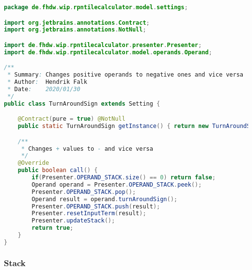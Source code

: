 \begin{lstlisting}[caption=TurnAroundSign (Falk),label=list:TurnAroundSign,language=Java]
package de.fhdw.wip.rpntilecalculator.model.settings;

import org.jetbrains.annotations.Contract;
import org.jetbrains.annotations.NotNull;

import de.fhdw.wip.rpntilecalculator.presenter.Presenter;
import de.fhdw.wip.rpntilecalculator.model.operands.Operand;

/**
 * Summary: Changes positive operands to negative ones and vice versa
 * Author:  Hendrik Falk
 * Date:    2020/01/30
 */
public class TurnAroundSign extends Setting {

    @Contract(pure = true) @NotNull
    public static TurnAroundSign getInstance() { return new TurnAroundSign(); }

    /**
     * Changes + values to - and vice versa
     */
    @Override
    public boolean call() {
        if(Presenter.OPERAND_STACK.size() == 0) return false;
        Operand operand = Presenter.OPERAND_STACK.peek();
        Presenter.OPERAND_STACK.pop();
        Operand result = operand.turnAroundSign();
        Presenter.OPERAND_STACK.push(result);
        Presenter.resetInputTerm(result);
        Presenter.updateStack();
        return true;
    }
}
\end{lstlisting} 

\subsubsection{Stack}   

